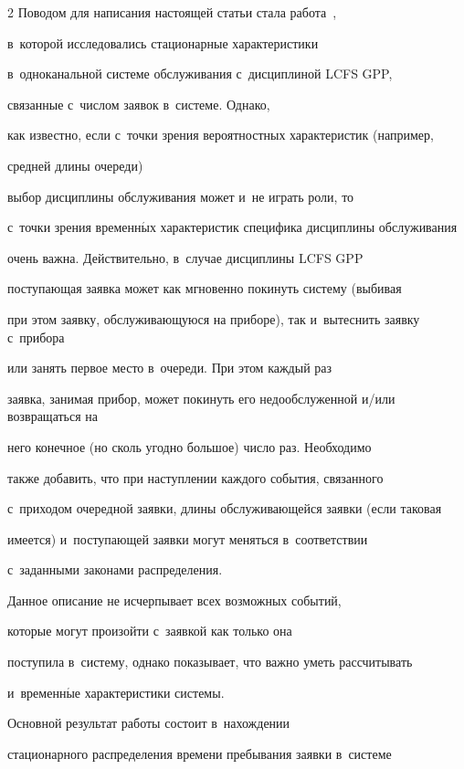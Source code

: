 \begin{multicols}{2}
Поводом для написания настоящей статьи стала работа~\cite{lataavrv},


в~которой исследовались стационарные характеристики


в~одноканальной системе обслуживания с~дисциплиной {LCFS GPP},


связанные с~чис\-лом заявок в~системе. Однако,


как известно, если с~точки зрения вероятностных характеристик (например,


средней длины очереди)


выбор дисциплины обслуживания может и~не играть роли, то


с~точки зрения временн$\acute{\mbox{ы}}$х характеристик специфика дисциплины обслуживания


очень важна. Действительно, в~случае дисциплины {LCFS GPP}


поступающая заявка может как мгновенно покинуть систему (выбивая


при этом заявку, обслуживающуюся на приборе), так и~вытеснить заявку с~прибора


или занять первое место в~очереди. При этом каждый раз


заявка, занимая прибор, может покинуть его недообслуженной и/или возвращаться на


него конечное (но сколь угодно большое) число раз. Необходимо


также добавить, что при наступлении каждого события, связанного


с~приходом очередной заявки, длины обслуживающейся заявки (если таковая


имеется) и~поступающей заявки могут меняться в~соответствии


с~заданными законами распределения.





Данное описание не исчерпывает всех возможных событий,


которые могут произойти с~заявкой как только она


поступила в~систему, однако показывает, что важно уметь рассчитывать


и~временн$\acute{\mbox{ы}}$е характеристики системы.





Основной результат работы состоит в~нахождении


стационарного распределения времени пребывания заявки в~системе



\end{multicols}
